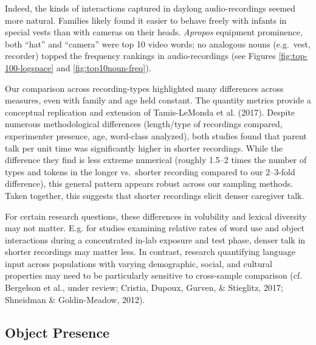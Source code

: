 \documentclass[man]{apa6}
\theoremstyle{definition}
\theoremstyle{definition}
\theoremstyle{definition}
\theoremstyle{remark}
\begin{document}
Indeed, the kinds of interactions captured in daylong audio-recordings
seemed more natural. Families likely found it easier to behave freely
with infants in special vests than with cameras on their heads.
\emph{Apropos} equipment prominence, both \enquote{hat} and
\enquote{camera} were top 10 video words; no analogous nouns (e.g.~vest,
recorder) topped the frequency rankings in audio-recordings (see Figures
\ref{fig:top-100-logspace} and \ref{fig:top10noun-freq}).

Our comparison across recording-types highlighted many differences
across measures, even with family and age held constant. The quantity
metrics provide a conceptual replication and extension of Tamis-LeMonda
et al. (2017). Despite numerous methodological differences (length/type
of recordings compared, experimenter presence, age, word-class
analyzed), both studies found that parent talk per unit time was
significantly higher in shorter recordings. While the difference they
find is less extreme numerical (roughly 1.5--2 times the number of types
and tokens in the longer vs.~shorter recording compared to our 2--3-fold
difference), this general pattern appears robust across our sampling
methods. Taken together, this suggests that shorter recordings elicit
denser caregiver talk.

For certain research questions, these differences in volubility and
lexical diversity may not matter. E.g. for studies examining relative
rates of word use and object interactions during a concentrated in-lab
exposure and test phase, denser talk in shorter recordings may matter
less. In contrast, research quantifying language input across
populations with varying demographic, social, and cultural properties
may need to be particularly sensitive to cross-sample comparison (cf.
Bergelson et al., under review; Cristia, Dupoux, Gurven, \& Stieglitz,
2017; Shneidman \& Goldin-Meadow, 2012).

\subsection{Object Presence}\label{object-presence}
\end{document}
